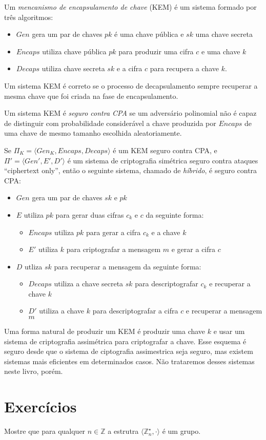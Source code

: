 Um {\em mencanismo de encapsulamento de chave} (KEM) é um sistema formado por três algoritmos:
\begin{itemize}
\item $Gen$ gera um par de chaves $pk$ é uma chave pública e $sk$ uma chave secreta
\item $Encaps$ utiliza chave pública $pk$ para produzir uma cifra $c$ e uma chave $k$
\item $Decaps$ utiliza chave secreta $sk$ e a cifra $c$ para recupera a chave $k$.
\end{itemize}

Um sistema KEM é correto se o processo de decapsulamento sempre recuperar a mesma chave que foi criada na fase de encapsulamento.

Um sistema KEM é {\em seguro contra CPA} se um adversário polinomial não é capaz de distinguir com probabilidade considerável a chave produzida por $Encaps$ de uma chave de mesmo tamanho escolhida aleatoriamente.

Se $\Pi_K = \langle Gen_K, Encaps, Decaps \rangle$ é um KEM seguro contra CPA, e $\Pi' = \langle Gen', E', D' \rangle$ é um sistema de criptografia simétrica seguro contra ataques ``ciphertext only'', então o seguinte sistema, chamado de {\em híbrido}, é seguro contra CPA:

\begin{itemize}
\item $Gen$ gera um par de chaves $sk$ e $pk$
\item $E$ utiliza $pk$ para gerar duas cifras $c_k$ e $c$ da seguinte forma:
  \begin{itemize}
  \item $Encaps$ utiliza $pk$ para gerar a cifra $c_k$ e a chave $k$
  \item $E'$ utiliza $k$ para criptografar a mensagem $m$ e gerar a cifra $c$
  \end{itemize}
\item $D$ utliza $sk$ para recuperar a mensagem da seguinte forma:
  \begin{itemize}
  \item $Decaps$ utiliza a chave secreta $sk$ para descriptografar $c_k$ e recuperar a chave $k$
  \item $D'$ utiliza a chave $k$ para descriptografar a cifra $c$ e recuperar a mensagem $m$
  \end{itemize}
\end{itemize}

Uma forma natural de produzir um KEM é produzir uma chave $k$ e usar um sistema de criptografia assimétrica para criptografar a chave.
Esse esquema é seguro desde que o sistema de ciptografia assimestrica seja seguro, mas existem sistemas mais eficientes em determinados casos.
Não trataremos desses sistemas neste livro, porém.


\section{Exercícios}
\label{sec:exercicios}


\begin{exercicio}
  \label{ex:euler}
  Mostre que para qualquer $n \in \mathbb{Z}$ a estrutra $\langle \mathbb{Z}_n^\star, \cdot \rangle$ é um grupo.
\end{exercicio}


